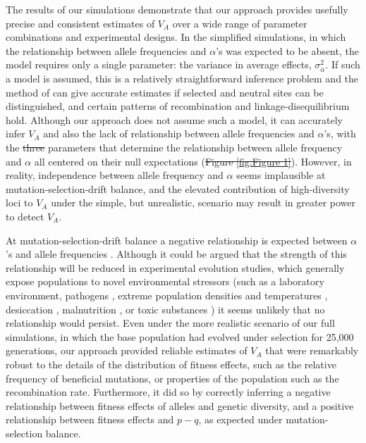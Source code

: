 \documentclass[12pt]{article}
\makeatletter
\providecommand{\DIFaddtex}[1]{{\protect\color{blue}\uwave{#1}}} %
\providecommand{\DIFdeltex}[1]{{\protect\color{red}\sout{#1}}} %
\providecommand{\DIFaddbegin}{} %
\providecommand{\DIFaddend}{} %
\providecommand{\DIFdelbegin}{} %
\providecommand{\DIFdelend}{} %
\providecommand{\DIFadd}[1]{\texorpdfstring{\DIFaddtex{#1}}{#1}} %
\providecommand{\DIFdel}[1]{\texorpdfstring{\DIFdeltex{#1}}{}} %
\newcommand{\DIFscaledelfig}{0.5}
\newlength{\DIFdelgraphicswidth} %
\newlength{\DIFdelgraphicsheight} %
\newcommand{\DIFaddincludegraphics}[2][]{{\color{blue}\fbox{\DIFOincludegraphics[#1]{#2}}}} %
\newcommand{\DIFdelincludegraphics}[2][]{%
\sbox{\DIFdelgraphicsbox}{\DIFOincludegraphics[#1]{#2}}%
\settoboxwidth{\DIFdelgraphicswidth}{\DIFdelgraphicsbox} %
\settoboxtotalheight{\DIFdelgraphicsheight}{\DIFdelgraphicsbox} %
\scalebox{\DIFscaledelfig}{%
\parbox[b]{\DIFdelgraphicswidth}{\usebox{\DIFdelgraphicsbox}\\[-\baselineskip] \rule{\DIFdelgraphicswidth}{0em}}\llap{\resizebox{\DIFdelgraphicswidth}{\DIFdelgraphicsheight}{%
\setlength{\unitlength}{\DIFdelgraphicswidth}%
\begin{picture}(1,1)%
\thicklines\linethickness{2pt} %
{\color[rgb]{1,0,0}\put(0,0){\framebox(1,1){}}}%
{\color[rgb]{1,0,0}\put(0,0){\line( 1,1){1}}}%
{\color[rgb]{1,0,0}\put(0,1){\line(1,-1){1}}}%
\end{picture}%
}\hspace*{3pt}}} %
} %
\DeclareRobustCommand{\DIFaddbegin}{\DIFOaddbegin \let\includegraphics\DIFaddincludegraphics} %
\DeclareRobustCommand{\DIFaddend}{\DIFOaddend \let\includegraphics\DIFOincludegraphics} %
\DeclareRobustCommand{\DIFdelbegin}{\DIFOdelbegin \let\includegraphics\DIFdelincludegraphics} %
\DeclareRobustCommand{\DIFdelend}{\DIFOaddend \let\includegraphics\DIFOincludegraphics} %
\let\sout@orig\sout %
\renewcommand{\sout}[1]{\ifmmode\text{\sout@orig{\ensuremath{#1}}}\else\sout@orig{#1}\fi} %
\makeatother
\begin{document}
\begin{bibunit}
The results of our simulations demonstrate that our approach provides usefully precise and consistent estimates of $V_A$ over a wide range of parameter combinations and experimental designs. In the simplified simulations, in which the relationship between allele frequencies and $\alpha$'s was expected to be absent, the model requires only a single parameter: the variance in average effects, $\sigma^2_{\bar{\alpha}}$. If such a model is assumed, this is a relatively straightforward inference problem and the method of \citet{buffalo2019linked} can give accurate estimates if selected and neutral sites can be distinguished, and certain patterns of recombination and linkage-disequilibrium hold.  Although our approach does not assume such a model, it can accurately infer $V_A$ and also the lack of relationship between allele frequencies and $\alpha$'s, with the \DIFdelbegin \DIFdel{three }\DIFdelend \DIFaddbegin \DIFadd{two }\DIFaddend parameters that determine the relationship between allele frequency and $\alpha$ all centered on their null expectations (\DIFdelbegin \DIFdel{Figure \ref{fig:Figure 1}}\DIFdelend \DIFaddbegin \DIFadd{\ref{fig:simplified_main}}\DIFaddend ). However, in reality, independence between allele frequency and $\alpha$ seems implausible at mutation-selection-drift balance, and the elevated contribution of high-diversity loci to $V_A$ under the simple, but unrealistic, scenario may result in greater power to detect $V_A$.

At mutation-selection-drift balance a negative relationship is expected between $\alpha$'s and allele frequencies \citep{Charlesworth.2010}. Although it could be argued that the strength of this relationship will be reduced in experimental evolution studies, which generally expose populations to novel environmental stressors (such as a laboratory environment, pathogens \citep{basu2024experimental}, extreme population densities \citep{joshi1996density} and temperatures \citep{singh2015egg, hsu2024reproductive}, desiccation \citep{gibbs1997physiological}, malnutrition \citep{kawecki2021genomic}, or toxic substances \citep{godinho2024limits, xiao2019experimental}) it seems unlikely that no relationship would persist. Even under the more realistic scenario of our full simulations, in which the base population had evolved under selection for 25,000 generations, our approach provided reliable estimates of $V_A$ that were remarkably robust to the details of the distribution of fitness effects, such as the relative frequency of beneficial mutations, or properties of the population such as the recombination rate. Furthermore, it did so by correctly inferring a negative relationship between fitness effects of alleles and genetic diversity, and a positive relationship between fitness effects and $p-q$, as expected under mutation-selection balance.


\end{bibunit}
\end{document}
